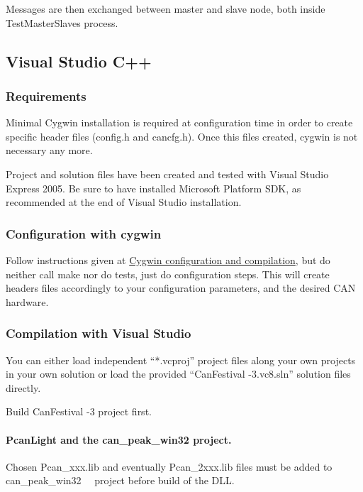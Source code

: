 \documentclass[12pt,english,a4paper]{book}
\begin{document}
Messages are then exchanged between master and slave node, both inside
TestMasterSlave{\textquotesingle}s process.

\subsection{Visual Studio C++}

\subsubsection{Requirements}

Minimal Cygwin installation is required at configuration time in order
to create specific header files (config.h and cancfg.h). Once this
files created, cygwin is not necessary any more.

Project and solution files have been created and tested with Visual
Studio Express 2005. Be sure to have installed Microsoft Platform
SDK, as recommended at the end of Visual Studio installation.


\subsubsection{Configuration with cygwin}

Follow instructions given at \hyperlink{Cygwin configuration and compilation}{Cygwin
configuration and compilation}, but do neither call make nor do tests,
just do configuration steps. This will create headers files accordingly
to your configuration parameters, and the desired CAN hardware.


\subsubsection{Compilation with Visual Studio}

You can either load independent {}``{*}.vcproj'' project files
along your own projects in your own solution or load the provided
{}``CanFestival -3.vc8.sln'' solution files directly.

Build CanFestival -3 project first.


\paragraph{PcanLight and the can\_peak\_win32 project.}

Chosen Pcan\_xxx.lib and eventually Pcan\_2xxx.lib files must be added
to can\_peak\_win32 \ \ project before build of the DLL.
\end{document}
